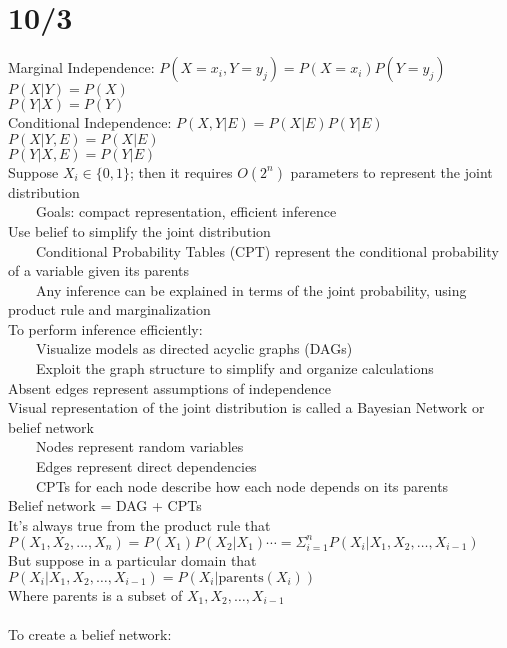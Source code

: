 \documentclass[10pt,letterpaper,unboxed,cm]{article}
\newcommand{\tab}{~~~~}
\begin{document}
\section{10/3}
Marginal Independence: $P(X = x_i, Y = y_j) = P(X = x_i)P(Y = y_j)$\\
 $P(X|Y) = P(X)$\\
  $P(Y|X) = P(Y)$\\
Conditional Independence: $P(X,Y|E) = P(X|E)P(Y|E)$\\
$P(X|Y,E) = P(X|E)$\\
$P(Y|X,E) = P(Y|E)$\\
Suppose $X_i \in \{0, 1\}$; then it requires $O(2^n)$ parameters to represent the joint distribution\\
\tab Goals: compact representation, efficient inference\\
Use belief to simplify the joint distribution\\
\tab Conditional Probability Tables (CPT) represent the conditional probability of a variable given its parents\\
\tab Any inference can be explained in terms of the joint probability, using product rule and marginalization\\
To perform inference efficiently:\\
\tab Visualize models as directed acyclic graphs (DAGs)\\
\tab Exploit the graph structure to simplify and organize calculations\\
Absent edges represent assumptions of independence\\
Visual representation of the joint distribution is called a Bayesian Network or belief network\\
\tab Nodes represent random variables\\
\tab Edges represent direct dependencies\\
\tab CPTs for each node describe how each node depends on its parents\\
Belief network = DAG + CPTs\\
It's always true from the product rule that $P(X_1, X_2, ..., X_n) = P(X_1)P(X_2|X_1)\cdots = \Sigma^n_{i=1}P(X_i|X_1, X_2, \ldots, X_{i-1})$\\
But suppose in a particular domain that $P(X_i|X_1, X_2, \ldots, X_{i-1}) = P(X_i|\text{parents}(X_i))$\\
Where parents is a subset of ${X_1, X_2, \ldots, X_{i-1}}$\\\\
To create a belief network: \\
\end{document}
